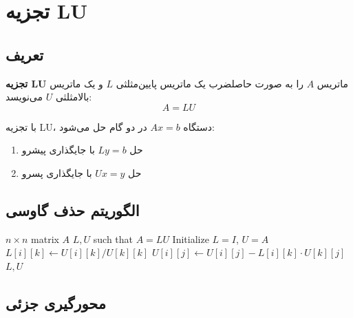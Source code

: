 \documentclass{matinbook}
\begin{document}
    \section{تجزیه LU}
    
    \subsection{تعریف}
    
    \begin{definition}[تجزیه LU]
        \textbf{تجزیه LU}
        ماتریس $A$ را به صورت حاصلضرب
        یک ماتریس پایین‌مثلثی $L$
        و یک ماتریس بالامثلثی $U$ می‌نویسد:
        \[
        A = LU
        \]
        \label{def:lu-decomposition}
    \end{definition}
    
    با تجزیه LU، دستگاه $Ax = b$
    در دو گام حل می‌شود:
    \begin{enumerate}
        \item حل $Ly = b$ با جایگذاری پیشرو
        \item حل $Ux = y$ با جایگذاری پسرو
    \end{enumerate}
    
    \subsection{الگوریتم حذف گاوسی}
    
    \begin{latin}
        \begin{algorithm}
            \begin{algorithmic}[1]
                \Require $n \times n$ matrix $A$
                \Ensure $L, U$ such that $A = LU$
                \State Initialize $L = I$, $U = A$
                \State $L[i][k] \gets U[i][k] / U[k][k]$
                \State $U[i][j] \gets U[i][j] - L[i][k] \cdot U[k][j]$
                \EndFor
                \EndFor
                \EndFor
                \State \Return $L, U$
            \end{algorithmic}
        \end{algorithm}
    \end{latin}
    
    \subsection{محورگیری جزئی}
    
\end{document}
